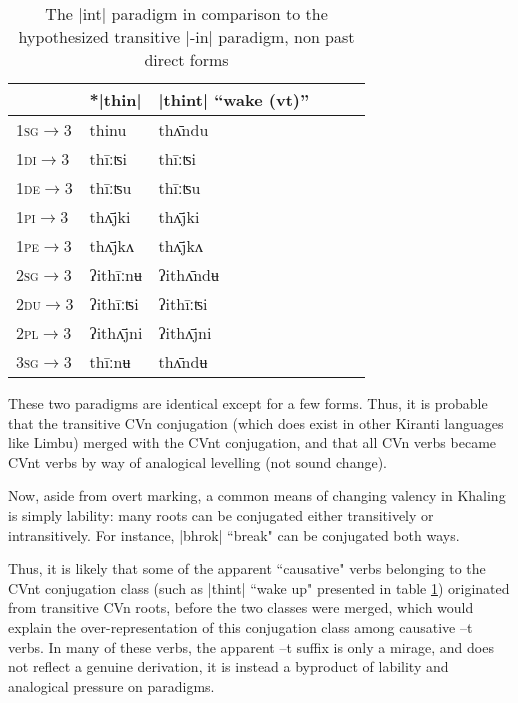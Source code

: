 \documentclass[oldfontcommands,oneside,a4paper,11pt]{article}
\newcommand{\ipa}[1]{{\phon #1}} %
\newcommand{\grise}[1]{\cellcolor{lightgray}\textbf{#1}}
\newcommand{\dhatu}[1]{|\ipa{#1}|}
\begin{document}
\begin{table}[h]
\caption{The \dhatu{int} paradigm in comparison to the hypothesized transitive |-in| paradigm, non past direct forms} \label{tab:int} \centering
\begin{tabular}{llllll}
\toprule
\textsc{} &	*\dhatu{thin}  &  	\dhatu{thint} ``wake (vt)''  \\  		
\midrule
\textsc{1sg$\rightarrow$3} &	\ipa{*thinu} \grise{}  &  	\ipa{thʌ̄ndu}  \\  		
\textsc{1di$\rightarrow$3}&	\ipa{thīːʦi}  &  	\ipa{thīːʦi}  \\  		
\textsc{1de$\rightarrow$3} &	\ipa{thīːʦu}  &  	\ipa{thīːʦu}  \\  		
\textsc{1pi$\rightarrow$3} &	\ipa{thʌ̄jki}  &  	\ipa{thʌ̄jki}  \\  		
\textsc{1pe$\rightarrow$3} &	\ipa{thʌ̄jkʌ}  &  	\ipa{thʌ̄jkʌ}  \\  		
\textsc{2sg$\rightarrow$3} &	\ipa{*ʔithīːnʉ}\grise{}   &  	\ipa{ʔithʌ̄ndʉ}  \\  		
\textsc{2du$\rightarrow$3} &	\ipa{ʔithīːʦi}  &  	\ipa{ʔithīːʦi}  \\  		
\textsc{2pl$\rightarrow$3} &	\ipa{ʔithʌ̄jni}  &  	\ipa{ʔithʌ̄jni}  \\  		
\textsc{3sg$\rightarrow$3} &	\ipa{*thīːnʉ}\grise{}   &  	\ipa{thʌ̄ndʉ}  \\  		
\bottomrule
\end{tabular}
\end{table}

These two paradigms are identical except for a few forms. Thus, it is probable that the transitive CVn conjugation (which does exist in other Kiranti languages like Limbu) merged with the CVnt conjugation, and that all CVn verbs became CVnt verbs  by way of analogical levelling (not sound change).

Now, aside from overt marking, a common means of changing valency in Khaling is simply lability: many roots can be conjugated either transitively or intransitively. For instance, \dhatu{bhrok} ``break" can be conjugated both ways. 


Thus, it is likely that some of the apparent ``causative" verbs belonging to the CVnt conjugation class (such as \dhatu{thint} ``wake up" presented in table \ref{tab:int}) originated from transitive CVn roots, before the two classes were merged, which would explain the over-representation of this conjugation class among causative \ipa{--t} verbs. In many of these verbs, the apparent --t suffix is only a mirage, and does not reflect a genuine derivation, it is instead a byproduct of lability and analogical pressure on paradigms.
\end{document}
